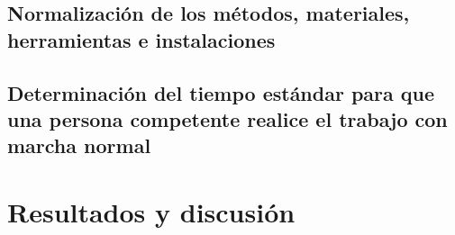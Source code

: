     \subsection{Normalización de los métodos, materiales, herramientas e instalaciones}
    \subsection{Determinación del tiempo estándar para que una persona competente realice el trabajo con marcha normal}
    
    
    
    
    
    
    
    \section{Resultados y discusión}
    
